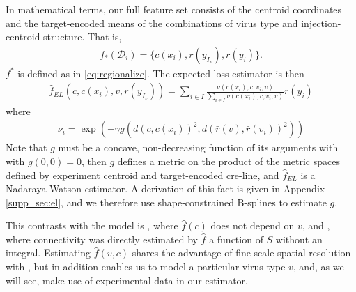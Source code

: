 \documentclass{article}
\begin{document}
In mathematical terms, our full feature set consists of the centroid coordinates and the target-encoded means of the combinations of virus type and injection-centroid structure.
That is, 
\begin{eqnarray*}
f_*({\mathcal D}_i) = \{c(x_i) , \bar r(y_{I_v}), r(y_i) \}.
\end{eqnarray*}
$f^*$ is defined as in \eqref{eq:regionalize}. The expected loss estimator is then 
\begin{eqnarray*}
\hat f_{EL} (c, c(x_i),v , r(y_{I_v})) =  \sum_{i \in I} \frac{ \nu {(c(x_i) , c, v_i, v)}}{\sum_{i \in I} \nu {(c(x_i) , c, v_i, v) }} r(y_i)
\end{eqnarray*}
where
\begin{eqnarray*}
\nu_i = \exp (- \gamma g( d(c, c(x_i))^2, d(\bar r (v), \bar r (v_i))^2))
\end{eqnarray*}
Note that $g$ must be a concave, non-decreasing function of its arguments with with $g(0,0) = 0$, then $g$ defines a metric on the product of the metric spaces defined by experiment centroid and target-encoded cre-line, and $\hat f_{EL}$ is a Nadaraya-Watson estimator.  A derivation of this fact is given in Appendix \ref{supp_sec:el}, and we therefore use shape-constrained B-splines to estimate $g$.

This contrasts with the model is \citet{Knox2019-ot}, where $\hat f(c)$ does not depend on $v$, and \citet{Oh2014-kh}, where connectivity was directly estimated by $\hat f$ a function of $S$ without an integral.
Estimating $\hat f(v, c)$ shares the advantage of fine-scale spatial resolution with \citet{Knox2019-ot}, but in addition enables us to model a particular virus-type $v$, and, as we will see, make use of experimental data in our estimator.





\end{document}
